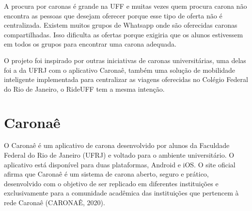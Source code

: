 A procura por caronas é grande na UFF e muitas vezes quem procura carona não encontra as pessoas que desejam oferecer porque esse tipo de oferta não é centralizada. Existem muitos grupos de Whatsapp onde são oferecidas caronas compartilhadas. Isso dificulta as ofertas porque exigiria que os alunos estivessem em todos os grupos para encontrar uma carona adequada.

O projeto foi inspirado por outras iniciativas de caronas universitárias, uma delas foi a da UFRJ com o aplicativo Caronaê, também uma solução de mobilidade inteligente implementada para centralizar as viagens oferecidas no Colégio Federal do Rio de Janeiro, o RideUFF tem a mesma intenção.



\section{Caronaê}


O Caronaê é um aplicativo de carona desenvolvido por alunos da Faculdade Federal do Rio de Janeiro (UFRJ) e voltado para o ambiente universitário. O aplicativo está disponível para duas plataformas, Android e iOS. O site oficial afirma que Caronaê é um sistema de carona aberto, seguro e prático, desenvolvido com o objetivo de ser replicado em diferentes instituições e exclusivamente para a comunidade acadêmica das instituições que pertencem à rede Caronaê (CARONAÊ, 2020).

